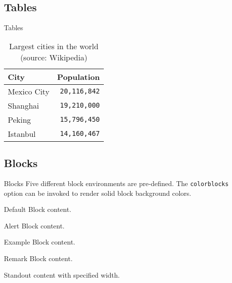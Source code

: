 \documentclass[aspectratio=169]{beamer}
\begin{document}
\subsection{Tables}
\begin{frame}{Tables}
  \begin{table}
    \caption{Largest cities in the world (source: Wikipedia)}
    \begin{tabular}{@{} lr @{}}
      \toprule
      City & Population\\
      \midrule
      Mexico City & \texttt{20,116,842}\\
      Shanghai    & \texttt{19,210,000}\\
      Peking      & \texttt{15,796,450}\\
      Istanbul    & \texttt{14,160,467}\\
      \bottomrule
    \end{tabular}
  \end{table}
\end{frame}

\subsection{Blocks}
\begin{frame}{Blocks}
  	Five different block environments are pre-defined. The \texttt{colorblocks} option can be invoked to render solid block background colors.
   
    \begin{block}{Default}
    Block content.
    \end{block}

    \begin{alertblock}{Alert}
    Block content.
    \end{alertblock}
    
    \begin{exampleblock}{Example}
    Block content.
    \end{exampleblock}

    \begin{remark}{Remark}
    Block content.
    \end{remark}
    
    \begin{standout}[4cm]
    Standout content with specified width.
    \end{standout}
\end{frame}
\end{document}
